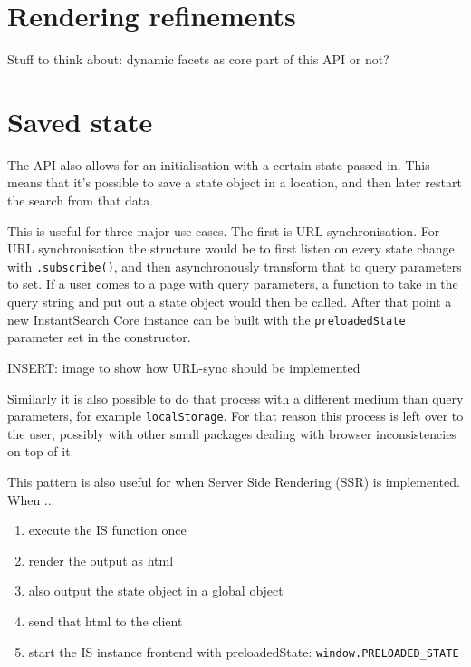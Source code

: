 
\section{Rendering refinements} %
\label{sec:rendering_refinements}

Stuff to think about: dynamic facets as core part of this API or not? %


\section{Saved state} %
\label{sec:saved_state}

The API also allows for an initialisation with a certain state passed in. This means that it's possible to save a state object in a location, and then later restart the search from that data. 

This is useful for three major use cases. The first is URL synchronisation. For URL synchronisation the structure would be to first listen on every state change with {\tt .subscribe()}, and then asynchronously transform that to query parameters to set. If a user comes to a page with query parameters, a function to take in the query string and put out a state object would then be called. After that point a new InstantSearch Core instance can be built with the {\tt preloadedState} parameter set in the constructor.

INSERT: image to show how URL-sync should be implemented %

Similarly it is also possible to do that process with a different medium than query parameters, for example {\tt localStorage}. For that reason this process is left over to the user, possibly with other small packages dealing with browser inconsistencies on top of it. 

This pattern is also useful for when Server Side Rendering (SSR) is implemented. When ...%

\begin{enumerate}
  \item execute the IS function once
  \item render the output as html
  \item also output the state object in a global object
  \item send that html to the client
  \item start the IS instance frontend with preloadedState: {\tt window.PRELOADED\_STATE} %
\end{enumerate}

